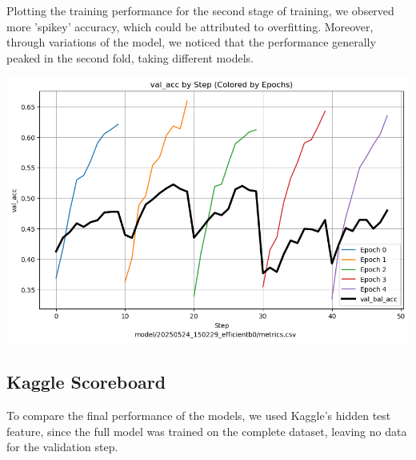 \documentclass[10pt]{article}
\begin{document}
\begin{minipage}{0.65\linewidth}
Plotting the training performance for the second stage of training, we observed more 'spikey' accuracy, which could be attributed to overfitting. Moreover, through variations of the model, we noticed that the performance generally peaked in the second fold, taking different models.
\end{minipage}
\hfill
\begin{minipage}{0.30\linewidth}
  \includegraphics[width=\linewidth]{img/semisuper_learning_val_acc.png}
\end{minipage}

\subsection*{Kaggle Scoreboard}

To compare the final performance of the models, we used Kaggle's hidden test feature, since the full model was trained on the complete dataset, leaving no data for the validation step.
\end{document}
